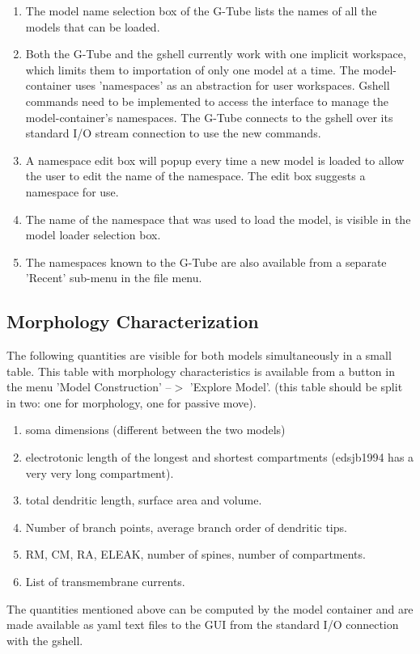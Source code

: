 \documentclass[12pt]{article}
\begin{document}
\begin{enumerate}
\item The model name selection box of the G-Tube lists the names of
  all the models that can be loaded.
\item Both the G-Tube and the gshell currently work with one implicit
  workspace, which limits them to importation of only one model at a
  time.  The model-container uses 'namespaces' as an abstraction for
  user workspaces.  Gshell commands need to be implemented to access
  the interface to manage the model-container's namespaces.  The
  G-Tube connects to the gshell over its standard I/O stream
  connection to use the new commands.
\item A namespace edit box will popup every time a new model is loaded
  to allow the user to edit the name of the namespace.  The edit box
  suggests a namespace for use.
\item The name of the namespace that was used to load the model, is
  visible in the model loader selection box.
\item The namespaces known to the G-Tube are also available from a
  separate 'Recent' sub-menu in the file menu.
\end{enumerate}


\subsection{Morphology Characterization}
The following quantities are visible for both models simultaneously
in a small table.  This table with morphology characteristics is
available from a button in the menu 'Model Construction' --$>$
'Explore Model'.  (this table should be split in two: one for
morphology, one for passive move).
\begin{enumerate}
\item soma dimensions (different between the two models)
\item electrotonic length of the longest and shortest compartments
  (edsjb1994 has a very very long compartment).
\item total dendritic length, surface area and volume.
\item Number of branch points, average branch order of dendritic tips.
\item RM, CM, RA, ELEAK, number of spines, number of compartments.
\item List of transmembrane currents.
\end{enumerate}
The quantities mentioned above can be computed by the model container
and are made available as yaml text files to the GUI from the standard
I/O connection with the gshell.
\end{document}
